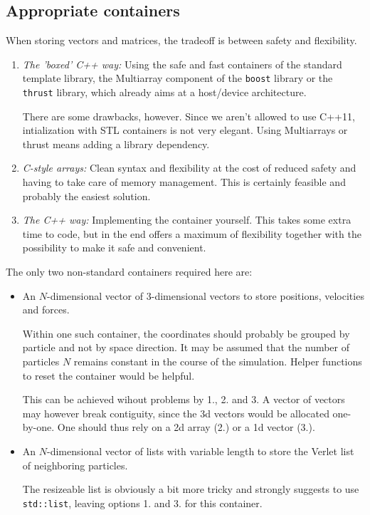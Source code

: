 \documentclass{scrartcl}
\begin{document}
\subsection{Appropriate containers}

When storing vectors and matrices, the tradeoff is between safety and
flexibility.

\begin{enumerate}
    \item \emph{The 'boxed' C++ way:} Using the safe and fast containers
        of the standard template library, 
        the Multiarray component of the \verb|boost| library
        or the \verb|thrust| library, which already aims at a host/device
        architecture.

        There are some drawbacks, however. 
        Since we aren't allowed to use C++11, intialization with STL containers
        is not very elegant. Using Multiarrays or thrust means adding a 
        library dependency.
    \item \emph{C-style arrays:} Clean syntax and flexibility 
        at the cost of reduced safety and having to take care of 
        memory management. This is certainly feasible and probably the 
        easiest solution.
    \item \emph{The C++ way:} Implementing the container yourself.
        This takes some extra time to code, but in the end offers a maximum of
        flexibility together with the possibility to make it safe and convenient.
\end{enumerate}

The only two non-standard containers required here are:
\begin{itemize}
    \item An $N$-dimensional vector of $3$-dimensional vectors to 
        store positions, velocities and forces.

        Within one such container, the coordinates should probably be grouped
        by particle and not by space direction. 
        It may be assumed that the number of particles $N$ remains constant
        in the course of the simulation.
        Helper functions to reset the container would be helpful.

        This can be achieved wihout problems by 1., 2. and 3.
        A vector of vectors may however break contiguity,
        since the 3d vectors would be allocated one-by-one.
        One should thus rely on a 2d array (2.) or a 1d vector (3.).

    \item An $N$-dimensional vector of lists with variable length
        to store the Verlet list of neighboring particles.

        The resizeable list is obviously a bit more tricky and strongly
        suggests to use \verb|std::list|, leaving options 1. and 3. 
        for this container.
\end{itemize}
\end{document}
